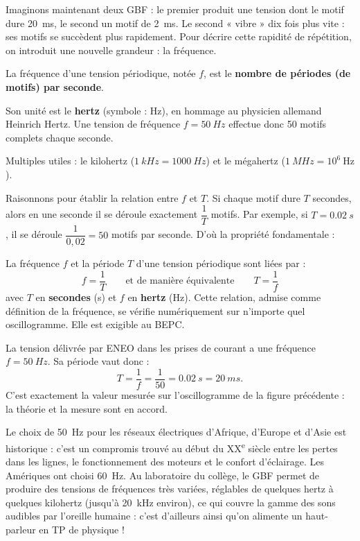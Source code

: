 \documentclass[11pt]{article}
\newcommand{\cle}[1]{{\popxbold\color{popdark}#1}}
\newcounter{popsec}
\newcounter{popsub}
\newcommand{\courssub}[1]{%
  \stepcounter{popsub}%
  \par\vspace{9pt}\noindent{\popxbold\fontsize{11.5}{13}\selectfont\color{popink}{\color{poporange}\thepopsec.\thepopsub}\hspace{6pt}#1}\par\nopagebreak\vspace{4pt}
}
\begin{document}
\courssub{La fréquence $f$ : nombre de motifs par seconde}

Imaginons maintenant deux GBF : le premier produit une tension dont le motif dure \SI{20}{ms}, le second un motif de \SI{2}{ms}. Le second « vibre » dix fois plus vite : ses motifs se succèdent plus rapidement. Pour décrire cette rapidité de répétition, on introduit une nouvelle grandeur : la fréquence.

\begin{definition}
La \cle{fréquence} d'une tension périodique, notée $f$, est le \textbf{nombre de périodes (de motifs) par seconde}.

Son unité est le \textbf{hertz} (symbole : Hz), en hommage au physicien allemand Heinrich Hertz. Une tension de fréquence $f = \SI{50}{Hz}$ effectue donc 50 motifs complets chaque seconde.

Multiples utiles : le kilohertz ($\SI{1}{kHz} = \SI{1000}{Hz}$) et le mégahertz ($\SI{1}{MHz} = 10^{6}\ \text{Hz}$).
\end{definition}

Raisonnons pour établir la relation entre $f$ et $T$. Si chaque motif dure $T$ secondes, alors en une seconde il se déroule exactement $\dfrac{1}{T}$ motifs. Par exemple, si $T = \SI{0,02}{s}$, il se déroule $\dfrac{1}{0,02} = 50$ motifs par seconde. D'où la propriété fondamentale :

\begin{propriete}
La fréquence $f$ et la période $T$ d'une tension périodique sont liées par :
\[ f = \frac{1}{T} \qquad \text{et de manière équivalente} \qquad T = \frac{1}{f} \]
avec $T$ en \textbf{secondes} (s) et $f$ en \textbf{hertz} (Hz). Cette relation, admise comme définition de la fréquence, se vérifie numériquement sur n'importe quel oscillogramme. Elle est exigible au BEPC.
\end{propriete}

\begin{exemplebox}
La tension délivrée par ENEO dans les prises de courant a une fréquence $f = \SI{50}{Hz}$. Sa période vaut donc :
\[ T = \frac{1}{f} = \frac{1}{50} = \SI{0,02}{s} = \SI{20}{ms}. \]
C'est exactement la valeur mesurée sur l'oscillogramme de la figure précédente : la théorie et la mesure sont en accord.
\end{exemplebox}

\begin{savaistu}[Pourquoi 50 Hz ?]
Le choix de \SI{50}{Hz} pour les réseaux électriques d'Afrique, d'Europe et d'Asie est historique : c'est un compromis trouvé au début du XX\textsuperscript{e} siècle entre les pertes dans les lignes, le fonctionnement des moteurs et le confort d'éclairage. Les Amériques ont choisi \SI{60}{Hz}. Au laboratoire du collège, le GBF permet de produire des tensions de fréquences très variées, réglables de quelques hertz à quelques kilohertz (jusqu'à \SI{20}{kHz} environ), ce qui couvre la gamme des sons audibles par l'oreille humaine : c'est d'ailleurs ainsi qu'on alimente un haut-parleur en TP de physique !
\end{savaistu}
\end{document}
